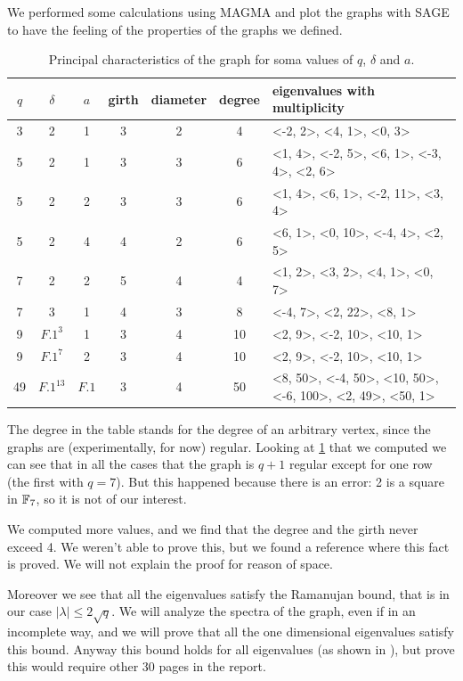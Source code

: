 We performed some calculations using MAGMA and plot the graphs with SAGE to have the feeling of the properties of the
graphs we defined.

\begin{table}\centering
\begin{tabular}{|c|c|c|c|c|c| p{4.2cm} |}
\hline
$q$ & $\delta$ & $a$ & girth & diameter & degree & eigenvalues with multiplicity \\
\hline
3 & 2 & 1 & 3 & 2 & 4 & <-2, 2>, <4, 1>, <0, 3>\\
5 & 2 & 1 & 3 & 3 & 6 & <1, 4>, <-2, 5>, <6, 1>, <-3, 4>, <2, 6>\\
5 & 2 & 2 & 3 & 3 & 6 & <1, 4>, <6, 1>, <-2, 11>, <3, 4>\\
5 & 2 & 4 & 4 & 2 & 6 & <6, 1>, <0, 10>, <-4, 4>, <2, 5>\\
7 & 2 & 2 & 5 & 4 & 4 & <1, 2>, <3, 2>, <4, 1>, <0, 7>\\
7 & 3 & 1 & 4 & 3 & 8 & <-4, 7>, <2, 22>, <8, 1>\\
9 & $F.1^3$ & 1 & 3 & 4 & 10 & <2, 9>, <-2, 10>, <10, 1>\\
9 & $F.1^7$ & 2 & 3 & 4 & 10 & <2, 9>, <-2, 10>, <10, 1>\\
49 & $F.1^13$ & $F.1$ & 3 & 4 & 50 & <8, 50>, <-4, 50>, <10, 50>, <-6, 100>, <2, 49>, <50, 1>\\
\hline
\end{tabular}
\caption{Principal characteristics of the graph for soma values of $q$, $\delta$ and $a$.}\label{tab}
\end{table}
The degree in the table stands for the degree of an arbitrary vertex, since the graphs are (experimentally, for now) regular.
Looking at \ref{tab} that we computed we can see that in all the cases that the graph is $q+1$ regular except for
one row (the first with $q=7$). But this happened because there is an error: 2 is a square in ${\mathbb F}_7$, so it is not of our interest.

We computed more values, and we find that the degree and the girth never exceed 4. We weren't able to prove this, but we found
a reference \cite{ANGEL199662} where this fact is proved. We will not explain the proof for reason of space.

Moreover we see that all the eigenvalues satisfy the Ramanujan bound, that is in our case $\vert \lambda \vert \le 2\sqrt{q}$.
We will analyze the spectra of the graph, even if in an incomplete way, and we will prove that all the one dimensional
eigenvalues satisfy this bound. Anyway this bound holds for all eigenvalues (as shown in \cite{terras_1999}),
but prove this would require other 30 pages in the report.

